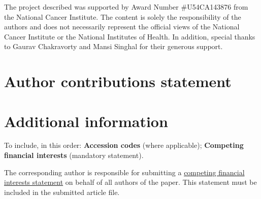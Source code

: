 \documentclass[fleqn,10pt]{wlscirep}
\begin{document}
The project described was supported by Award Number \#U54CA143876 from the National Cancer Institute.  
The content is solely the responsibility of the authors and does not necessarily represent the official views of the National Cancer Institute or the National Institutes of Health. 
In addition, special thanks to Gaurav Chakravorty and Mansi Singhal for their generous support. 

\section*{Author contributions statement}


\section*{Additional information}

To include, in this order: \textbf{Accession codes} (where applicable); \textbf{Competing financial interests} (mandatory statement). 

The corresponding author is responsible for submitting a \href{http://www.nature.com/srep/policies/index.html#competing}{competing financial interests statement} on behalf of all authors of the paper. This statement must be included in the submitted article file.

%

%

%

\end{document}
